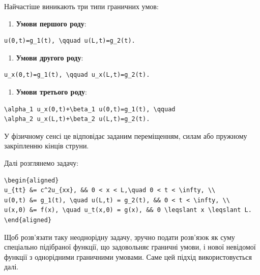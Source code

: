 \documentclass[
  ukrainian,
]{article}
\providecommand{\tightlist}{%
  \setlength{\itemsep}{0pt}\setlength{\parskip}{0pt}}
\begin{document}
Найчастіше виникають три типи граничних умов:

\begin{enumerate}
\def\labelenumi{\arabic{enumi}.}
\tightlist
\item
  \textbf{Умови першого роду}:
\end{enumerate}

\begin{verbatim}
u(0,t)=g_1(t), \qquad u(L,t)=g_2(t).
\end{verbatim}

\begin{enumerate}
\def\labelenumi{\arabic{enumi}.}
\setcounter{enumi}{1}
\tightlist
\item
  \textbf{Умови другого роду}:
\end{enumerate}

\begin{verbatim}
u_x(0,t)=g_1(t), \qquad u_x(L,t)=g_2(t).
\end{verbatim}

\begin{enumerate}
\def\labelenumi{\arabic{enumi}.}
\setcounter{enumi}{2}
\tightlist
\item
  \textbf{Умови третього роду}:
\end{enumerate}

\begin{verbatim}
\alpha_1 u_x(0,t)+\beta_1 u(0,t)=g_1(t), \qquad
\alpha_2 u_x(L,t)+\beta_2 u(L,t)=g_2(t).
\end{verbatim}

У фізичному сенсі це відповідає заданим переміщенням, силам або пружному
закріпленню кінців струни.

Далі розглянемо задачу:

\begin{verbatim}
\begin{aligned}
u_{tt} &= c^2u_{xx}, && 0 < x < L,\quad 0 < t < \infty, \\
u(0,t) &= g_1(t), \quad u(L,t) = g_2(t), && 0 < t < \infty, \\
u(x,0) &= f(x), \quad u_t(x,0) = g(x), && 0 \leqslant x \leqslant L.
\end{aligned}
\end{verbatim}

Щоб розв'язати таку неоднорідну задачу, зручно подати розв'язок як суму
спеціально підібраної функції, що задовольняє граничні умови, і нової
невідомої функції з однорідними граничними умовами. Саме цей підхід
використовується далі.
\end{document}
